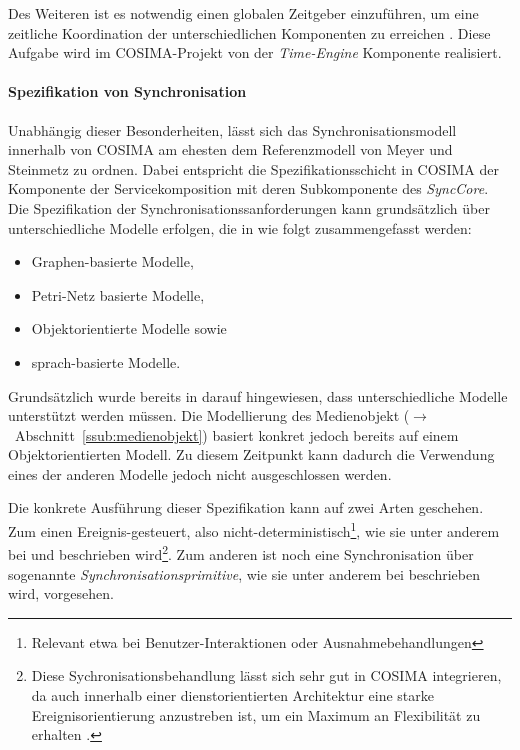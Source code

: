   Des Weiteren ist es notwendig einen globalen Zeitgeber einzuführen, um eine zeitliche Koordination der unterschiedlichen Komponenten zu erreichen \citep[S. 610]{multimedia_technologie}. Diese Aufgabe wird im COSIMA-Projekt von der \emph{Time-Engine} Komponente realisiert.


\paragraph{Spezifikation von Synchronisation} %
\label{par:spezifikation_von_synchronisation}

  Unabhängig dieser Besonderheiten, lässt sich das Synchronisationsmodell innerhalb von COSIMA am ehesten dem Referenzmodell von Meyer und Steinmetz zu ordnen. Dabei entspricht die Spezifikationsschicht in COSIMA der Komponente der Servicekomposition mit deren Subkomponente des \emph{SyncCore}. Die Spezifikation der Synchronisationssanforderungen kann grundsätzlich über unterschiedliche Modelle erfolgen, die in \citep[S. 617]{bertino1998tsm} wie folgt zusammengefasst werden:
  
  \begin{itemize}
    \item Graphen-basierte Modelle, 
    \item Petri-Netz basierte Modelle, 
    \item Objektorientierte Modelle sowie 
    \item sprach-basierte Modelle.
  \end{itemize}
  
  Grundsätzlich wurde bereits in \citep[S. 34]{bericht} darauf hingewiesen, dass unterschiedliche Modelle unterstützt werden müssen. Die Modellierung des Medienobjekt (\mbox{$\to$ Abschnitt \ref{ssub:medienobjekt}}) basiert konkret jedoch bereits auf einem Objektorientierten Modell. Zu diesem Zeitpunkt kann dadurch die Verwendung eines der anderen Modelle jedoch nicht ausgeschlossen werden.

  Die konkrete Ausführung dieser Spezifikation kann auf zwei Arten geschehen. Zum einen Ereignis-gesteuert, also nicht-deterministisch\footnote{Relevant etwa bei Benutzer-Interaktionen oder Ausnahmebehandlungen}, wie sie unter anderem bei \citep{little1991ms} und \citep{bertino1998tsm} beschrieben wird\footnote{Diese Sychronisationsbehandlung lässt sich sehr gut in COSIMA integrieren, da auch innerhalb einer dienstorientierten Architektur eine starke Ereignisorientierung anzustreben ist, um ein Maximum an Flexibilität zu erhalten \citep[S. 96]{masak2007ssb}.}. Zum anderen ist noch eine Synchronisation über sogenannte \emph{Synchronisationsprimitive}, wie sie unter anderem bei \citep{gaggi2005msh} beschrieben wird, vorgesehen.
  
